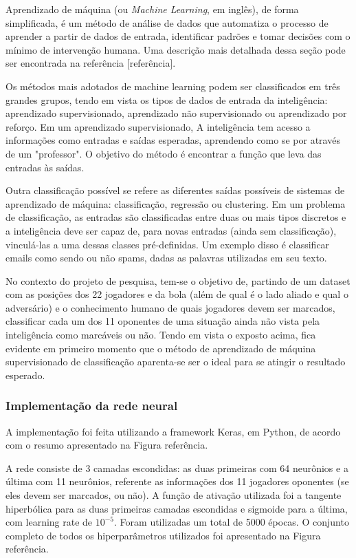 \documentclass[a4paper,12pt]{article}
\begin{document}
Aprendizado de máquina (ou \textit{Machine Learning}, em inglês), de forma simplificada, é um método de análise de dados que automatiza o processo de aprender a partir de dados de entrada, identificar padrões e tomar decisões com o mínimo de intervenção humana. Uma descrição mais detalhada dessa seção pode ser encontrada na referência [referência].

Os métodos mais adotados de machine learning podem ser classificados em três grandes grupos, tendo em vista os tipos de dados de entrada da inteligência: aprendizado supervisionado, aprendizado não supervisionado ou  aprendizado por reforço. Em um aprendizado supervisionado, A inteligência tem acesso a informações como
entradas e saídas esperadas, aprendendo como se por através de um "professor". O objetivo do método é encontrar a função que leva das entradas às saídas.

Outra classificação possível se refere as diferentes saídas possíveis de sistemas de aprendizado de máquina: classificação, regressão ou clustering. Em um problema de classificação, as entradas são classificadas entre duas ou mais tipos discretos e a inteligência deve ser capaz de, para novas entradas (ainda sem classificação), vinculá-las a uma dessas classes pré-definidas. Um exemplo disso é classificar emails como sendo ou não spams, dadas as palavras utilizadas em seu texto.

No contexto do projeto de pesquisa, tem-se o objetivo de, partindo de um dataset com as posições dos 22 jogadores e da bola (além de qual é o lado aliado e qual o adversário) e o conhecimento humano de quais jogadores devem ser marcados, classificar cada um dos 11 oponentes de uma situação ainda não vista pela inteligência como marcáveis ou não. Tendo em vista o exposto acima, fica evidente em primeiro momento que o método de aprendizado de máquina supervisionado de classificação aparenta-se ser o ideal para se atingir o resultado esperado.

\subsubsection{Implementação da rede neural}

A implementação foi feita utilizando a framework Keras, em Python, de acordo com o resumo apresentado na Figura referência.

A rede consiste de 3 camadas escondidas: as duas primeiras com 64 neurônios e a última com 11 neurônios, referente as informações dos 11 jogadores oponentes (se eles devem ser marcados, ou não). A função de ativação utilizada foi a tangente hiperbólica para as duas primeiras camadas escondidas e sigmoide para a última, com learning rate de $10^{-5}$. Foram utilizadas um total de 5000 épocas. O conjunto completo de todos os hiperparâmetros utilizados foi apresentado na Figura referência.
\end{document}

